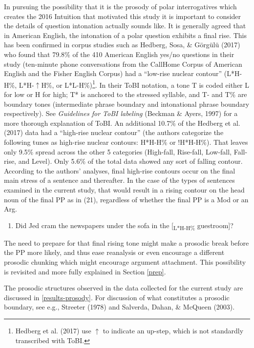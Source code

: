 \documentclass[11pt,oneside]{book}
\providecommand{\tightlist}{%
  \setlength{\itemsep}{0pt}\setlength{\parskip}{0pt}}
\let\rmarkdownfootnote\footnote%
\def\footnote{\protect\rmarkdownfootnote}
\begin{document}
In pursuing the possibility that it is the prosody of polar interrogatives which creates the 2016 Intuition that motivated this study it is important to consider the details of question intonation actually sounds like. It is generally agreed that in American English, the intonation of a polar question exhibits a final rise. This has been confirmed in corpus studies such as Hedberg, Sosa, \& Görgülü (2017) who found that 79.8\% of the 410 American English yes/no questions in their study (ten-minute phone conversations from the CallHome Corpus of American English and the Fisher English Corpus) had a ``low-rise nuclear contour'' (L*H-H\%, L*H-\(\uparrow\)H\%, or L*L-H\%)\footnote{Hedberg et al. (2017) use \(\uparrow\) to indicate an up-step, which is not standardly transcribed with ToBI.}. In their ToBI notation, a tone T is coded either L for low or H for high; T* is anchored to the stressed syllable, and T- and T\% are boundary tones (intermediate phrase boundary and intonational phrase boundary respectively). See \emph{Guidelines for ToBI labeling} (Beckman \& Ayers, 1997) for a more thorough explanation of ToBI. An additional 10.7\% of the Hedberg et al. (2017) data had a ``high-rise nuclear contour'' (the authors categorize the following tunes as high-rise nuclear contours: H*H-H\% or !H*H-H\%). That leaves only 9.5\% spread across the other 5 categories (High-fall, Rise-fall, Low-fall, Fall-rise, and Level). Only 5.6\% of the total data showed any sort of falling contour. According to the authors' analyses, final high-rise contours occur on the final main stress of a sentence and thereafter. In the case of the types of sentences examined in the current study, that would result in a rising contour on the head noun of the final PP as in (21), regardless of whether the final PP is a Mod or an Arg.

\begin{enumerate}
\def\labelenumi{(\arabic{enumi})}
\setcounter{enumi}{20}
\tightlist
\item
  Did Jed cram the newspapers under the sofa in the {[}\textsubscript{L*H-H\%} guestroom{]}?
\end{enumerate}

The need to prepare for that final rising tone might make a prosodic break before the PP more likely, and thus ease reanalysis or even encourage a different prosodic chunking which might encourage argument attachment. This possibility is revisited and more fully explained in Section \ref{prep}.

The prosodic structures observed in the data collected for the current study are discussed in \ref{results-prosody}. For discussion of what constitutes a prosodic boundary, see e.g., Streeter (1978) and Salverda, Dahan, \& McQueen (2003).
\end{document}
